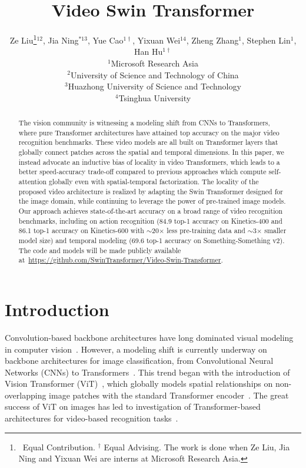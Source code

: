 \documentclass{article}
\title{Video Swin Transformer}
\author{%
  Ze Liu\thanks{~Equal Contribution. $^{\dag}$ Equal Advising. The work is done when Ze Liu, Jia Ning and Yixuan Wei are interns at Microsoft Research Asia. }\hspace{1.2mm}$^{12}$, Jia Ning$^{*13}$, Yue Cao$^{1\dag}$, Yixuan Wei$^{14}$, Zheng Zhang$^{1}$, Stephen Lin$^{1}$, Han Hu$^{1\dag}$ \\
  $^1$Microsoft Research Asia\\
  $^2$University of Science and Technology of China\\
  $^3$Huazhong University of Science and Technology\\
  $^4$Tsinghua University\\
}
\begin{document}
\maketitle


\begin{abstract}
The vision community is witnessing a modeling shift from CNNs to Transformers, where pure Transformer architectures have attained top accuracy on the major video recognition benchmarks. These video models are all built on Transformer layers that globally connect patches across the spatial and temporal dimensions. In this paper, we instead advocate an inductive bias of locality in video Transformers, which leads to a better speed-accuracy trade-off compared to previous approaches which compute self-attention globally even with spatial-temporal factorization. The locality of the proposed video architecture is realized by adapting the Swin Transformer designed for the image domain, while continuing to leverage the power of pre-trained image models. Our approach achieves state-of-the-art accuracy on a broad range of video recognition benchmarks, including on action recognition (84.9 top-1 accuracy on Kinetics-400 and 86.1 top-1 accuracy on Kinetics-600 with $\sim$20$\times$ less pre-training data and $\sim$3$\times$ smaller model size) and temporal modeling (69.6 top-1 accuracy on Something-Something v2). The code and models will be made publicly available at~\url{https://github.com/SwinTransformer/Video-Swin-Transformer}.
\end{abstract}

\section{Introduction}


Convolution-based backbone architectures have long dominated visual modeling in computer vision~\cite{lecun1998lenet,krizhevsky2012alexnet,simonyan2014vgg,szegedy2015googlenet,he2015resnet,huang2017densely}. However, a modeling shift is currently underway on backbone architectures for image classification, from Convolutional Neural Networks (CNNs) to Transformers~\cite{dosovitskiy2020vit,touvron2020deit,liu2021swin}. This trend began with the introduction of Vision Transformer (ViT)~\cite{dosovitskiy2020vit,touvron2020deit}, which globally models spatial relationships on non-overlapping image patches with the standard Transformer encoder~\cite{vaswani2017attention}. The great success of ViT on images has led to investigation of Transformer-based architectures for video-based recognition tasks~\cite{arnab2021vivit, timesformer2021}.
\end{document}
